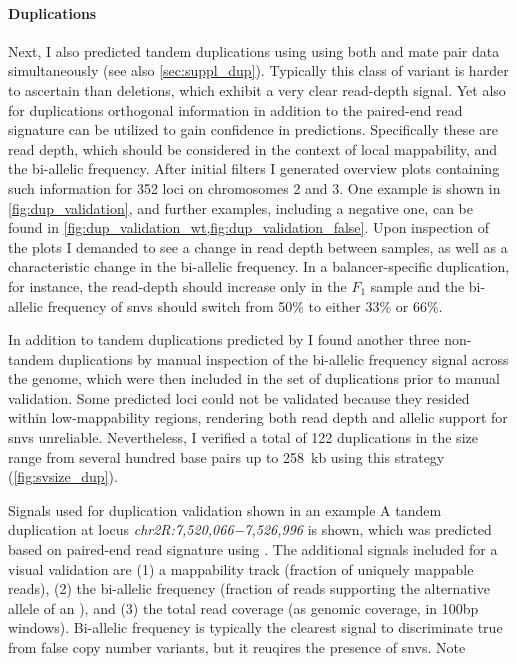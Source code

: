 \paragraph{Duplications} Next, I also predicted tandem duplications using \delly
using both \wgs and mate pair data simultaneously (see also
\cref{sec:suppl_dup}). Typically this class of variant is harder to
ascertain than deletions, which exhibit a very clear read-depth signal.
Yet also for duplications orthogonal information in addition
to the paired-end read signature can be utilized to gain confidence in
predictions. Specifically these are read depth, which should be considered in
the context of local mappability, and the bi-allelic frequency.                 
After initial filters I generated overview plots containing such information for
352 loci on chromosomes 2 and 3. One example is shown in
\cref{fig:dup_validation}, and further examples, including a negative one, can
be found in \cref{fig:dup_validation_wt,fig:dup_validation_false}.
Upon inspection of the plots I demanded to see a change in read depth between
samples, as well as a characteristic change in the bi-allelic frequency. In a
balancer-specific duplication, for instance, the read-depth should increase only
in the $F_1$ sample and the bi-allelic frequency of \acp{snv} should switch from
50\% to either 33\% or 66\%.

In addition to tandem duplications predicted by \delly I found another three
non-tandem duplications by manual inspection of the bi-allelic frequency signal
across the genome, which were then included in the set of duplications prior
to manual validation. Some predicted loci could not be validated because they
resided within low-mappability regions, rendering both read depth and allelic
support for \acp{snv} unreliable. Nevertheless, I verified a total of 122
duplications in the size range from several hundred base pairs up to 258~kb
using this strategy (\cref{fig:svsize_dup}).

    {Signals used for duplication validation shown in an example}
    {A tandem duplication at locus \textit{chr2R:7,520,066−7,526,996} is shown,
    which was predicted based on paired-end read signature using \delly.
    The additional signals
    included for a visual validation are (1) a mappability track (fraction
    of uniquely mappable reads), (2) the bi-allelic frequency (fraction of
    reads supporting the alternative allele of an \snv), and (3)
    the total read coverage (as genomic coverage, in 100bp windows). Bi-allelic
    frequency is typically the clearest signal to discriminate true from false
    copy number variants, but it reuqires the presence of \acp{snv}. Note }

